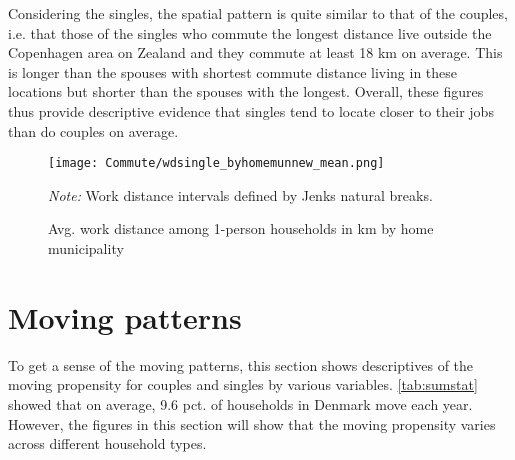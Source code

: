 Considering the singles, the spatial pattern is quite similar to that of the couples, i.e. that those of the singles who commute the longest distance live outside the Copenhagen area on Zealand and they commute at least 18 km on average. This is longer than the spouses with shortest commute distance living in these locations but shorter than the spouses with the longest. Overall, these figures thus provide descriptive evidence that singles tend to locate closer to their jobs than do couples on average.
\begin{figure}[!htb]
\centering
\begin{minipage}{0.8\textwidth}
\texttt{[image: Commute/wdsingle\_byhomemunnew\_mean.png]} 
{\tiny \emph{Note:} Work distance intervals defined by Jenks natural breaks. \par}
\end{minipage}
\caption{Avg. work distance among 1-person households in km by home municipality}
\end{figure}

\section{Moving patterns}
To get a sense of the moving patterns, this section shows descriptives of the moving propensity for couples and singles by various variables. \autoref{tab:sumstat} showed that on average, 9.6 pct. of households in Denmark move each year. However, the figures in this section will show that the moving propensity varies across different household types. 

